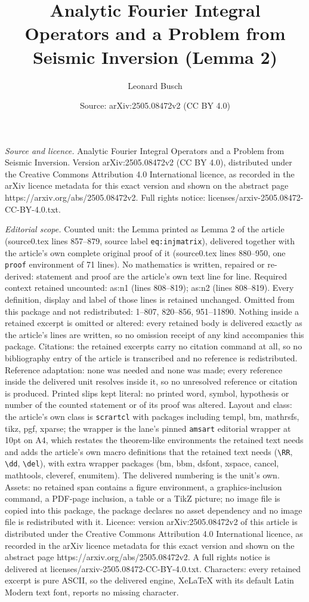 \documentclass[10pt,a4paper]{amsart}
\title[Analytic Fourier Integral Operators and a Problem from Seism]{Analytic Fourier Integral Operators and a Problem from Seismic Inversion (Lemma 2)}
\author{Leonard Busch}
\date{Source: arXiv:2505.08472v2 (CC BY 4.0)}
\begin{document}
\maketitle

\noindent\emph{Source and licence.} Analytic Fourier Integral Operators and a Problem from Seismic Inversion. Version arXiv:2505.08472v2 (CC BY 4.0), distributed under the Creative Commons Attribution 4.0 International licence, as recorded in the arXiv licence metadata for this exact version and shown on the abstract page https://arxiv.org/abs/2505.08472v2. Full rights notice: licenses/arxiv-2505.08472-CC-BY-4.0.txt.\par\smallskip

\noindent\textit{Editorial scope.} Counted unit: the Lemma printed as Lemma 2 of the article (source0.tex lines 857--879, source label \texttt{eq:injmatrix}), delivered together with the article's own complete original proof of it (source0.tex lines 880--950, one \texttt{proof} environment of 71 lines). No mathematics is written, repaired or re-derived: statement and proof are the article's own text line for line. Required context retained uncounted: as:n1 (lines 808--819); as:n2 (lines 808--819). Every definition, display and label of those lines is retained unchanged. Omitted from this package and not redistributed: 1--807, 820--856, 951--11890. Nothing inside a retained excerpt is omitted or altered: every retained body is delivered exactly as the article's lines are written, so no omission receipt of any kind accompanies this package. Citations: the retained excerpts carry no citation command at all, so no bibliography entry of the article is transcribed and no reference is redistributed. Reference adaptation: none was needed and none was made; every reference inside the delivered unit resolves inside it, so no unresolved reference or citation is produced. Printed slips kept literal: no printed word, symbol, hypothesis or number of the counted statement or of its proof was altered. Layout and class: the article's own class is \texttt{scrartcl} with packages including templ, bm, mathrsfs, tikz, pgf, xparse; the wrapper is the lane's pinned \texttt{amsart} editorial wrapper at 10pt on A4, which restates the theorem-like environments the retained text needs and adds the article's own macro definitions that the retained text needs (\texttt{\textbackslash RR}, \texttt{\textbackslash dd}, \texttt{\textbackslash del}), with extra wrapper packages (bm, bbm, dsfont, xspace, cancel, mathtools, cleveref, enumitem). The delivered numbering is the unit's own. Assets: no retained span contains a figure environment, a graphics-inclusion command, a PDF-page inclusion, a table or a TikZ picture; no image file is copied into this package, the package declares no asset dependency and no image file is redistributed with it. Licence: version arXiv:2505.08472v2 of this article is distributed under the Creative Commons Attribution 4.0 International licence, as recorded in the arXiv licence metadata for this exact version and shown on the abstract page https://arxiv.org/abs/2505.08472v2. A full rights notice is delivered at licenses/arxiv-2505.08472-CC-BY-4.0.txt. Characters: every retained excerpt is pure ASCII, so the delivered engine, XeLaTeX with its default Latin Modern text font, reports no missing character.
\end{document}
